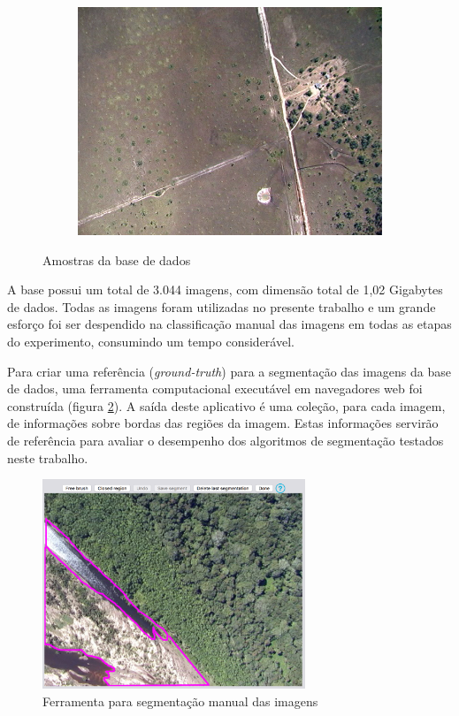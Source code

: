 \begin{figure}[h]
\begin{subfigure}[b]{0.3\textwidth}
    \includegraphics[width=\textwidth]{imgs/amostra3}
  \end{subfigure}%
  \caption{Amostras da base de dados}
  \label{fig:amostra}
\end{figure}

A base possui um total de 3.044 imagens, com dimensão total de 1,02 Gigabytes de dados. Todas as imagens foram utilizadas no presente trabalho e um grande esforço foi ser despendido na classificação manual das imagens em todas as etapas do experimento, consumindo um tempo considerável.

Para criar uma referência (\textit{ground-truth}) para a segmentação das imagens da base de dados, uma ferramenta computacional executável em navegadores web foi construída (figura \ref{fig:manualseg}). A saída deste aplicativo é uma coleção, para cada imagem, de informações sobre bordas das regiões da imagem. Estas informações servirão de referência para avaliar o desempenho dos algoritmos de segmentação testados neste trabalho.

\begin{figure}[h]
  \centering
  \includegraphics[width=0.7\textwidth]{imgs/manualseg}
  \caption{Ferramenta para segmentação manual das imagens}
  \label{fig:manualseg}
\end{figure}

